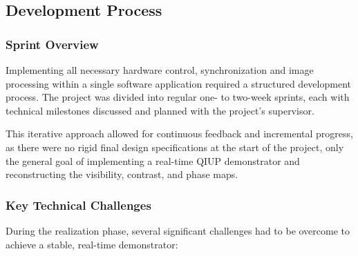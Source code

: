 \documentclass[12pt,a4paper]{article}
\begin{document}
    \subsection{Development Process}
        \subsubsection{Sprint Overview}
            Implementing all necessary hardware control, synchronization and image processing within a single software application required a structured development process. The project was divided into regular one- to two-week sprints, each with technical milestones discussed and planned with the project's supervisor. 
            
            This iterative approach allowed for continuous feedback and incremental progress, as there were no rigid final design specifications at the start of the project, only the general goal of implementing a real-time \ac{QIUP} demonstrator and reconstructing the visibility, contrast, and phase maps.

        \subsubsection{Key Technical Challenges}
            During the realization phase, several significant challenges had to be overcome to achieve a stable, real-time demonstrator:
\end{document}
